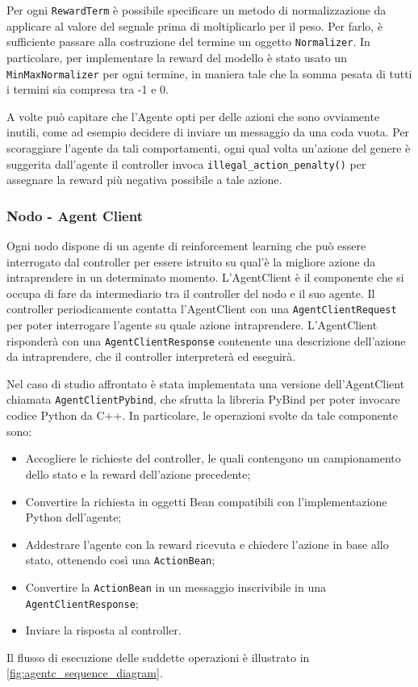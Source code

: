 \documentclass[conference]{IEEEtran}
\newcommand{\code}[1]{\texttt{#1}}
\begin{document}
Per ogni \code{RewardTerm} è possibile specificare un metodo di normalizzazione da
applicare al valore del segnale prima di moltiplicarlo per il peso. Per farlo, è
sufficiente passare alla costruzione del termine un oggetto \code{Normalizer}. In
particolare, per implementare la reward del modello è stato usato un
\code{MinMaxNormalizer} per ogni termine, in maniera tale che la somma pesata di tutti i termini sia compresa tra -1 e 0.

A volte può capitare che l'Agente opti per delle azioni che sono ovviamente inutili,
come ad esempio decidere di inviare un messaggio da una coda vuota. Per scoraggiare
l'agente da tali comportamenti, ogni qual volta un'azione del genere è suggerita
dall'agente il controller invoca \code{illegal\_action\_penalty()} per assegnare
la reward più negativa possibile a tale azione. 

\subsubsection{Nodo - Agent Client}
Ogni nodo dispone di un agente di reinforcement learning che può essere interrogato
dal controller per essere istruito su qual'è la migliore azione da intraprendere in un
determinato momento. L'AgentClient è il componente che si occupa di fare da intermediario
tra il controller del nodo e il suo agente. Il controller periodicamente contatta
 l'AgentClient con una \code{AgentClientRequest}
per poter interrogare l'agente
su quale azione intraprendere. L'AgentClient risponderà con una
\code{AgentClientResponse} contenente una descrizione dell'azione da intraprendere,
che il controller interpreterà ed eseguirà.

Nel caso di studio affrontato è stata implementata una versione dell'AgentClient chiamata
\code{AgentClientPybind}, che sfrutta la libreria PyBind per poter invocare codice
Python da C++. In particolare, le operazioni svolte da tale componente sono:
\begin{itemize}
    \item Accogliere le richieste del controller, le quali contengono un campionamento
    dello stato e la reward dell'azione precedente;
    \item Convertire la richiesta in oggetti Bean compatibili con l'implementazione Python
    dell'agente;
    \item Addestrare l'agente con la reward ricevuta e chiedere l'azione in base 
    allo stato, ottenendo così una \code{ActionBean};
    \item Convertire la \code{ActionBean} in un messaggio inscrivibile 
    in una \code{AgentClientResponse};
    \item Inviare la risposta al controller.
\end{itemize}
Il flusso di esecuzione delle suddette operazioni è illustrato in \autoref{fig:agentc_sequence_diagram}.
\end{document}
